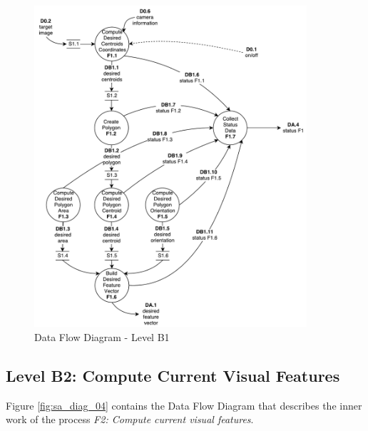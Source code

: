 \begin{figure}[!htb]
	\centering
	\includegraphics[width=0.9\textwidth]{content/chapter_03/images/sa_diagram_03.pdf}
	\caption{Data Flow Diagram - Level B1}
	\label{fig:sa_diag_03}
\end{figure}

\pagebreak

\subsection{Level B2: Compute Current Visual Features}
\label{sec:level-B2}

Figure \ref{fig:sa_diag_04} contains the Data Flow Diagram that describes the inner work of the process \textit{F2: Compute current visual features}.

